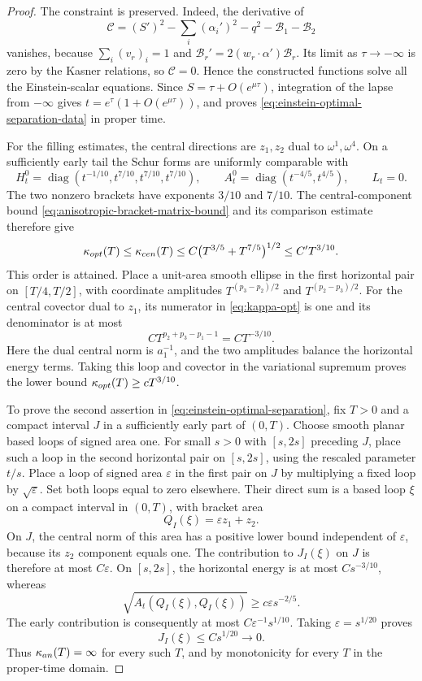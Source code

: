 \documentclass[10pt,a4paper]{amsart}
\begin{document}
\begin{proof}
The constraint is preserved.  Indeed, the derivative of
\[
 \mathcal C=(S')^2-\sum_i(\alpha_i')^2-q^2
                  -\mathcal B_1-\mathcal B_2
\]
vanishes, because $\sum_i(v_r)_i=1$ and
$\mathcal B_r'=2(w_r\cdot\alpha')\mathcal B_r$.
Its limit as $\tau\to-\infty$ is zero by the Kasner relations, so
$\mathcal C=0$.  Hence the constructed functions solve all the
Einstein-scalar equations.  Since
$S=\tau+O(e^{\mu\tau})$, integration of the lapse from $-\infty$
gives $t=e^\tau(1+O(e^{\mu\tau}))$, and proves
\eqref{eq:einstein-optimal-separation-data} in proper time.

For the filling estimates, the central directions are $z_1,z_2$
dual to $\omega^1,\omega^4$.  On a sufficiently early tail the Schur
forms are uniformly comparable with
\begin{equation}
 H_t^0=\operatorname{diag}
    (t^{-1/10},t^{7/10},t^{7/10},t^{7/10}),
 \qquad
 A_t^0=\operatorname{diag}(t^{-4/5},t^{4/5}),
 \qquad L_t=0.
 \label{eq:einstein-optimal-schur-powers}
\end{equation}
The two nonzero brackets have exponents $3/10$ and $7/10$.
The central-component bound
\eqref{eq:anisotropic-bracket-matrix-bound} and its comparison
estimate therefore give
\[
 \kappa_{\rm opt}(T)\le\kappa_{\rm cen}(T)
       \le C\bigl(T^{3/5}+T^{7/5}\bigr)^{1/2}
       \le C' T^{3/10}.
\]
This order is attained.  Place a unit-area smooth ellipse in the
first horizontal pair on $[T/4,T/2]$, with coordinate amplitudes
$T^{(p_3-p_2)/2}$ and $T^{(p_2-p_3)/2}$.
For the central covector dual to $z_1$, its numerator in
\eqref{eq:kappa-opt} is one and its denominator is at most
\[
 C T^{p_2+p_3-p_1-1}=C T^{-3/10}.
\]
Here the dual central norm is $a_1^{-1}$, and the two amplitudes
balance the horizontal energy terms.  Taking this loop and covector
in the variational supremum proves the lower bound
$\kappa_{\rm opt}(T)\ge cT^{3/10}$.

To prove the second assertion in
\eqref{eq:einstein-optimal-separation}, fix $T>0$ and a compact
interval $J$ in a sufficiently early part of $(0,T)$.
Choose smooth planar based loops of signed area one.  For small
$s>0$ with $[s,2s]$ preceding $J$, place such a loop in the second
horizontal pair on $[s,2s]$, using the rescaled parameter $t/s$.
Place a loop of signed area $\varepsilon$ in the first pair on $J$
by multiplying a fixed loop by $\sqrt\varepsilon$.  Set both loops
equal to zero elsewhere.  Their direct sum is a based loop $\xi$
on a compact interval in $(0,T)$, with bracket area
\[
 Q_I(\xi)=\varepsilon z_1+z_2.
\]
On $J$, the central norm of this area has a positive lower bound
independent of $\varepsilon$, because its $z_2$ component equals one.
The contribution to $J_I(\xi)$ on $J$ is therefore at most
$C\varepsilon$.  On $[s,2s]$, the horizontal energy is at most
$C s^{-3/10}$, whereas
\[
 \sqrt{A_t(Q_I(\xi),Q_I(\xi))}
       \ge c\varepsilon s^{-2/5}.
\]
The early contribution is consequently at most
$C\varepsilon^{-1}s^{1/10}$.  Taking
$\varepsilon=s^{1/20}$ proves
\[
 J_I(\xi)\le C s^{1/20}\longrightarrow0.
\]
Thus $\kappa_{\rm an}(T)=\infty$ for every such $T$, and by
monotonicity for every $T$ in the proper-time domain.


\end{proof}
\end{document}
